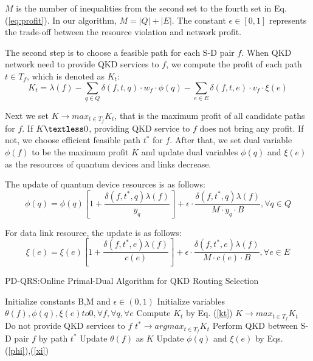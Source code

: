 $M$ is the number of inequalities from the second set to the fourth set in Eq.(\ref{eq:profit}). In our algorithm, $M = |Q| + |E|$. The constant $\epsilon \in [0,1]$ represents the trade-off between the resource violation and network profit.

The second step is to choose a feasible path for each S-D pair $f$. When QKD network need to provide QKD services to $f$, we compute the profit of each path $t \in T_f$, which is denoted as $K_t$:
\begin{equation}
    K_t = \lambda(f) - \sum_{q \in Q}\delta(f,t,q) \cdot w_f \cdot \phi(q) -  \sum_{e \in E}\delta(f,t,e) \cdot v_f \cdot \xi(e)
    \label{kt}
\end{equation}

Next we set $K \rightarrow max_{t \in T_f} K_t$, that is the maximum profit of all candidate paths for $f$. If $K \textless 0$, providing QKD service to $f$ does not bring any profit. If not, we choose efficient feasible path $t^*$ for $f$. After that, we set dual variable $\phi(f)$ to be the maximum profit $K$ and update dual variables $\phi(q)$ and $\xi(e)$ as the resources of quantum devices and links decrease.

The update of quantum device resources is as follows:
\begin{equation}
    \phi(q) = \phi(q)[1+\frac{\delta(f,t^*,q)\lambda(f)}{y_q}] + \epsilon \cdot \frac{\delta(f,t^*,q)\lambda(f)}{M \cdot y_q \cdot B}, \forall q \in Q
    \label{phi}
\end{equation}

For data link resource, the update is as follows:
\begin{equation}
    \xi(e) = \xi(e)[1+\frac{\delta(f,t^*,e)\lambda(f)}{c(e)}] + \epsilon \cdot \frac{\delta(f,t^*,e)\lambda(f)}{M \cdot c(e)\cdot B}, \forall e \in E
    \label{xi}
\end{equation}

\begin{algorithm}[h]
\caption{PD-QRS:Online Primal-Dual Algorithm for QKD Routing Selection}
\begin{algorithmic}[1]
\STATE  Initialize constants B,M and $\epsilon \in (0,1)$
\STATE Initialize variables $\theta(f),\phi(q),\xi(e) to 0,\forall f,\forall q,\forall e$
\STATE Compute $K_t$ by Eq. (\ref{kt})
\ENDFOR
\STATE $K \rightarrow max_{t \in T_f} K_t$
\STATE Do not provide QKD services to $f$
\ELSE
\STATE $t^* \rightarrow argmax_{t \in T_f}K_t$
\STATE Perform QKD between S-D pair $f$ by path $t^*$
\STATE Update $\theta(f)$ as $K$
\STATE Update $\phi(q)$ and $\xi(e)$ by Eqs. (\ref{phi}),(\ref{xi})
\ENDIF
\end{algorithmic}
\label{pd-qrs}
\end{algorithm}
	
